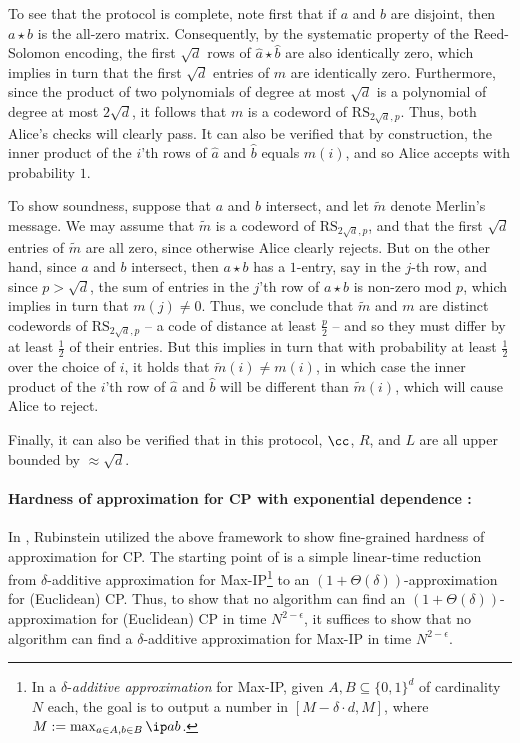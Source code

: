 \documentclass[11pt]{article}
\begin{document}
 To see that the protocol is complete, note first that if $a$ and $b$ are disjoint, then $a \star b$ is the all-zero matrix. Consequently, by the systematic property of the Reed-Solomon encoding, the first $\sqrt{d}$ rows of $\hat a \star \hat b$ are also identically zero, which implies in turn that the first $\sqrt{d}$ entries of $m$ are identically zero. Furthermore, since the product of
two polynomials of degree at most $\sqrt{d}$ is a polynomial of degree at most $2 \sqrt{d}$, it follows that $m$ is a codeword of $\mathrm{RS}_{2\sqrt{d},p}$. Thus, both Alice's checks will clearly pass. It can also be verified that by construction, the inner product of the $i$'th rows of $\hat a$ and $\hat b$ equals $m(i)$, and so Alice accepts with probability $1$.

To show soundness, suppose that $a$ and $b$ intersect, and let $\tilde m$ denote Merlin's message. We may assume that $\tilde m$ is a codeword of $\mathrm{RS}_{2\sqrt{d},p}$, and that the first $\sqrt{d}$ entries of $\tilde m$ are all zero, since otherwise Alice clearly rejects. But on the other hand, since $a$ and $b$ intersect, then $a \star b$ has a $1$-entry, say in the $j$-th row, and since $p>\sqrt{d}$, the sum of entries in the $j$'th row of $a \star b$ is non-zero mod $p$, which implies in turn that $m(j) \neq 0$. Thus, we conclude that $\tilde m$ and $m$ are distinct codewords of $\mathrm{RS}_{2\sqrt{d},p}$ -- a code of distance at least $\frac p 2$ -- and so they must differ by at least $\frac 1 2$ of their entries. But this implies in turn that with probability at least $\frac 1 2$ over the choice of $i$, it holds that 
$\tilde m(i)\neq m(i)$, in which case the inner product of the $i$'th row of $\hat a$ and $\hat b$ will be different than $\tilde m(i)$, which will cause Alice to reject.

Finally, it can also be verified that in this protocol, $\cc$, $R$, and $L$ are all upper bounded by $\approx \sqrt{d}$. 


\paragraph{Hardness of approximation for CP with exponential dependence \cite{Rub18}:}

In \cite{Rub18}, Rubinstein utilized the above framework to show fine-grained hardness of approximation for CP. 
The starting point of \cite{Rub18}  is a simple linear-time reduction
from $\delta$-additive approximation for Max-IP\footnote{In a $\delta$-\emph{additive approximation} for Max-IP, given $A, B\subseteq\{0,1\}^d$ of cardinality $N$ each, the goal is to output a number in $[M - \delta \cdot d, M]$, where $M:=\max_{a \in A, b \in B} \ip a b$.}  to an $(1+\Theta(\delta))$-approximation for (Euclidean) CP. Thus, to show that no algorithm can find an $(1+\Theta(\delta))$-approximation for (Euclidean) CP in time $N^{2-\epsilon}$, it suffices to show that no algorithm can find a $\delta$-additive approximation for Max-IP in time $N^{2-\epsilon}$. 
\end{document}
